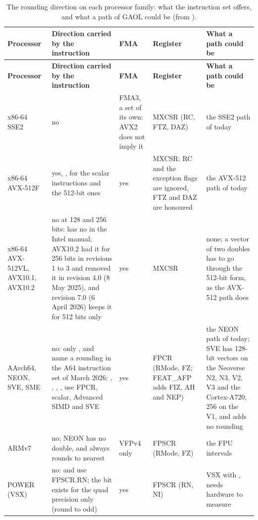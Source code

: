 \documentclass[12pt,a4paper,twoside,openright]{book}
\begin{document}
\begingroup\footnotesize
\begin{longtable}{|L{2.0cm}|L{3.8cm}|L{2.1cm}|L{2.0cm}|L{2.9cm}|}
\caption[The rounding direction on each processor family]{The rounding direction on each processor family: what the
instruction set offers, and what a path of GAOL could be (from
).}\label{tab:computing-processors}\\
\hline
\textbf{Processor} & \textbf{Direction carried by the instruction}
& \textbf{FMA} & \textbf{Register} & \textbf{What a path could be} \\
\hline
\endfirsthead
\hline
\textbf{Processor} & \textbf{Direction carried by the instruction}
& \textbf{FMA} & \textbf{Register} & \textbf{What a path could be} \\
\hline
\endhead
\hline
\endfoot
\endlastfoot
x86-64 SSE2 & no & FMA3, a set of its own: AVX2 does not imply it
& MXCSR (RC, FTZ, DAZ) & the SSE2 path of today \\
\hline
x86-64 AVX-512F & yes, , for the scalar instructions and the
512-bit ones & yes & MXCSR: RC and the exception flags are ignored, FTZ and
DAZ are honoured & the AVX-512 path of today \\
\hline
x86-64 AVX-512VL, AVX10.1, AVX10.2 & no at 128 and 256 bits:
 has no  in the Intel manual; AVX10.2 had it
for 256 bits in revisions 1 to 3 and removed it in revision 4.0 (8 May
2025), and revision 7.0 (6 April 2026) keeps it for 512 bits only & yes &
MXCSR & none; a vector of two doubles has to go through the 512-bit form,
as the AVX-512 path does \\
\hline
AArch64, NEON, SVE, SME & no: only ,  and
 name a rounding in the A64 instruction set of March 2026;
, , , ,  use FPCR,
scalar, Advanced SIMD and SVE & yes & FPCR (RMode, FZ; FEAT\_AFP adds FIZ,
AH and NEP) & the NEON path of today; SVE has 128-bit vectors on the
Neoverse N2, N3, V2, V3 and the Cortex-A720, 256 on the V1, and adds no
rounding \\
\hline
ARMv7 & no; NEON has no double, and always rounds to nearest & VFPv4 only
& FPSCR (RMode, FZ) & the FPU intervals \\
\hline
POWER (VSX) & no:  and  use FPSCR.RN; the
 bit exists for the quad precision only (round to odd) & yes &
FPSCR (RN, NI) & VSX  with , needs hardware to
measure \\

\end{longtable}
\end{document}
